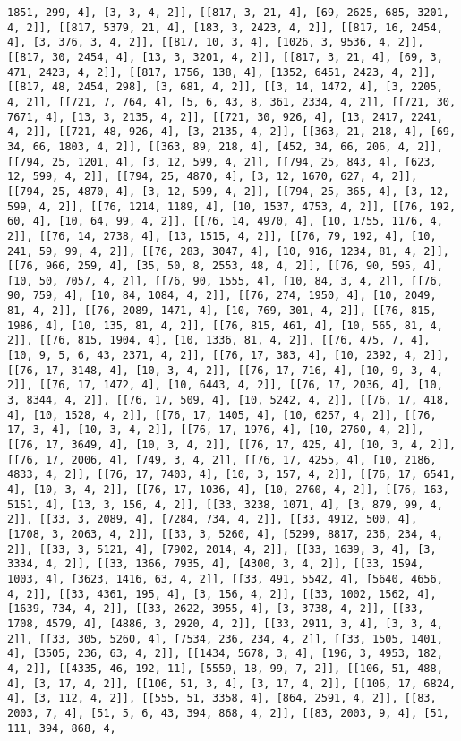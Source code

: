 \documentclass[12pt,fleqn]{article}\usepackage{../../common}
\begin{document}
\begin{verbatim}
1851, 299, 4], [3, 3, 4, 2]], [[817, 3, 21, 4], [69, 2625, 685, 3201, 4, 2]], [[817, 5379, 21, 4], [183, 3, 2423, 4, 2]], [[817, 16, 2454, 4], [3, 376, 3, 4, 2]], [[817, 10, 3, 4], [1026, 3, 9536, 4, 2]], [[817, 30, 2454, 4], [13, 3, 3201, 4, 2]], [[817, 3, 21, 4], [69, 3, 471, 2423, 4, 2]], [[817, 1756, 138, 4], [1352, 6451, 2423, 4, 2]], [[817, 48, 2454, 298], [3, 681, 4, 2]], [[3, 14, 1472, 4], [3, 2205, 4, 2]], [[721, 7, 764, 4], [5, 6, 43, 8, 361, 2334, 4, 2]], [[721, 30, 7671, 4], [13, 3, 2135, 4, 2]], [[721, 30, 926, 4], [13, 2417, 2241, 4, 2]], [[721, 48, 926, 4], [3, 2135, 4, 2]], [[363, 21, 218, 4], [69, 34, 66, 1803, 4, 2]], [[363, 89, 218, 4], [452, 34, 66, 206, 4, 2]], [[794, 25, 1201, 4], [3, 12, 599, 4, 2]], [[794, 25, 843, 4], [623, 12, 599, 4, 2]], [[794, 25, 4870, 4], [3, 12, 1670, 627, 4, 2]], [[794, 25, 4870, 4], [3, 12, 599, 4, 2]], [[794, 25, 365, 4], [3, 12, 599, 4, 2]], [[76, 1214, 1189, 4], [10, 1537, 4753, 4, 2]], [[76, 192, 60, 4], [10, 64, 99, 4, 2]], [[76, 14, 4970, 4], [10, 1755, 1176, 4, 2]], [[76, 14, 2738, 4], [13, 1515, 4, 2]], [[76, 79, 192, 4], [10, 241, 59, 99, 4, 2]], [[76, 283, 3047, 4], [10, 916, 1234, 81, 4, 2]], [[76, 966, 259, 4], [35, 50, 8, 2553, 48, 4, 2]], [[76, 90, 595, 4], [10, 50, 7057, 4, 2]], [[76, 90, 1555, 4], [10, 84, 3, 4, 2]], [[76, 90, 759, 4], [10, 84, 1084, 4, 2]], [[76, 274, 1950, 4], [10, 2049, 81, 4, 2]], [[76, 2089, 1471, 4], [10, 769, 301, 4, 2]], [[76, 815, 1986, 4], [10, 135, 81, 4, 2]], [[76, 815, 461, 4], [10, 565, 81, 4, 2]], [[76, 815, 1904, 4], [10, 1336, 81, 4, 2]], [[76, 475, 7, 4], [10, 9, 5, 6, 43, 2371, 4, 2]], [[76, 17, 383, 4], [10, 2392, 4, 2]], [[76, 17, 3148, 4], [10, 3, 4, 2]], [[76, 17, 716, 4], [10, 9, 3, 4, 2]], [[76, 17, 1472, 4], [10, 6443, 4, 2]], [[76, 17, 2036, 4], [10, 3, 8344, 4, 2]], [[76, 17, 509, 4], [10, 5242, 4, 2]], [[76, 17, 418, 4], [10, 1528, 4, 2]], [[76, 17, 1405, 4], [10, 6257, 4, 2]], [[76, 17, 3, 4], [10, 3, 4, 2]], [[76, 17, 1976, 4], [10, 2760, 4, 2]], [[76, 17, 3649, 4], [10, 3, 4, 2]], [[76, 17, 425, 4], [10, 3, 4, 2]], [[76, 17, 2006, 4], [749, 3, 4, 2]], [[76, 17, 4255, 4], [10, 2186, 4833, 4, 2]], [[76, 17, 7403, 4], [10, 3, 157, 4, 2]], [[76, 17, 6541, 4], [10, 3, 4, 2]], [[76, 17, 1036, 4], [10, 2760, 4, 2]], [[76, 163, 5151, 4], [13, 3, 156, 4, 2]], [[33, 3238, 1071, 4], [3, 879, 99, 4, 2]], [[33, 3, 2089, 4], [7284, 734, 4, 2]], [[33, 4912, 500, 4], [1708, 3, 2063, 4, 2]], [[33, 3, 5260, 4], [5299, 8817, 236, 234, 4, 2]], [[33, 3, 5121, 4], [7902, 2014, 4, 2]], [[33, 1639, 3, 4], [3, 3334, 4, 2]], [[33, 1366, 7935, 4], [4300, 3, 4, 2]], [[33, 1594, 1003, 4], [3623, 1416, 63, 4, 2]], [[33, 491, 5542, 4], [5640, 4656, 4, 2]], [[33, 4361, 195, 4], [3, 156, 4, 2]], [[33, 1002, 1562, 4], [1639, 734, 4, 2]], [[33, 2622, 3955, 4], [3, 3738, 4, 2]], [[33, 1708, 4579, 4], [4886, 3, 2920, 4, 2]], [[33, 2911, 3, 4], [3, 3, 4, 2]], [[33, 305, 5260, 4], [7534, 236, 234, 4, 2]], [[33, 1505, 1401, 4], [3505, 236, 63, 4, 2]], [[1434, 5678, 3, 4], [196, 3, 4953, 182, 4, 2]], [[4335, 46, 192, 11], [5559, 18, 99, 7, 2]], [[106, 51, 488, 4], [3, 17, 4, 2]], [[106, 51, 3, 4], [3, 17, 4, 2]], [[106, 17, 6824, 4], [3, 112, 4, 2]], [[555, 51, 3358, 4], [864, 2591, 4, 2]], [[83, 2003, 7, 4], [51, 5, 6, 43, 394, 868, 4, 2]], [[83, 2003, 9, 4], [51, 111, 394, 868, 4, 
\end{verbatim}
\end{document}
